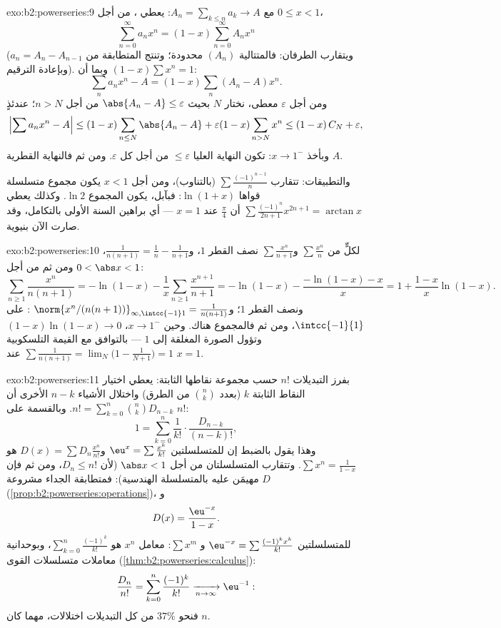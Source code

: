 \begin{solution}{exo:b2:powerseries:9}
مع $A_n = \sum_{k \leq n} a_k \to A$: يعطي ، من أجل
$0 \leq x < 1$،
\[
\sum_{n=0}^{\infty} a_n x^n = (1 - x)\sum_{n=0}^{\infty} A_n x^n
\]
(ويتقارب الطرفان: فالمتتالية $(A_n)$ محدودة؛ وتنتج المتطابقة
من $a_n = A_n - A_{n-1}$ وبإعادة الترقيم). وبما أن $(1 -
x)\sum x^n = 1$:
\[
\sum_n a_nx^n - A = (1-x)\sum_{n} (A_n - A)x^n .
\]
ومن أجل $\varepsilon$ معطى، نختار $N$ بحيث $\abs{A_n - A} \leq
\varepsilon$ من أجل $n > N$؛ عندئذٍ
\[
\Bigl|\sum a_nx^n - A\Bigr|
\leq (1-x)\sum_{n \leq N}\abs{A_n - A} + \varepsilon(1 -
x)\sum_{n > N}x^n
\leq (1-x)\,C_N + \varepsilon ,
\]
وبأخذ $x \to 1^-$: تكون النهاية العليا $\leq \varepsilon$ من أجل كل
$\varepsilon$. ومن ثم فالنهاية القطرية $A$.

والتطبيقات: تتقارب $\sum \frac{(-1)^{n-1}}{n}$ (بالتناوب)،
ومن أجل $x < 1$ يكون مجموع متسلسلة قواها $\ln(1 + x)$: فبآبل،
يكون المجموع $\ln 2$. وكذلك يعطي $\sum\frac{(-1)^n}{2n+1}x^{2n+1} =
\arctan x$ أن $\frac\pi4$ عند $x = 1$ --- أي براهين
السنة الأولى بالتكامل، وقد صارت الآن بنيوية.
\end{solution}

\begin{solution}{exo:b2:powerseries:10}
لكلٍّ من $\sum\frac{x^n}{n}$ و$\sum\frac{x^n}{n+1}$ نصف القطر
$1$، و$\frac{1}{n(n+1)} = \frac1n - \frac1{n+1}$، ومن ثم من أجل $0
< \abs x < 1$:
\[
\sum_{n\geq1}\frac{x^n}{n(n+1)}
= -\ln(1-x) - \frac1x\sum_{n\geq1}\frac{x^{n+1}}{n+1}
= -\ln(1-x) - \frac{-\ln(1-x) - x}{x}
= 1 + \frac{1-x}{x}\ln(1-x) .
\]
ونصف القطر $1$؛ و$\norm{x^n/(n(n+1))}_{\infty,\intcc{-1}1} =
\frac{1}{n(n+1)}$ :  على
$\intcc{-1}{1}$، ومن ثم فالمجموع  هناك. وحين $x \to
1^-$، $(1-x)\ln(1-x) \to 0$ وتؤول الصورة المغلقة إلى $1$ ---
بالتوافق مع القيمة التلسكوبية $\sum\frac{1}{n(n+1)} =
\lim_N\bigl(1 - \frac{1}{N+1}\bigr) = 1$ عند $x = 1$.
\end{solution}

\begin{solution}{exo:b2:powerseries:11}
بفرز التبديلات $n!$ حسب مجموعة نقاطها الثابتة: يعطي اختيار
النقاط الثابتة $k$ (بعدد $\binom nk$ من الطرق) واختلال الأشياء
$n - k$ الأخرى أن $n! = \sum_{k=0}^n\binom nk D_{n-k}$.
وبالقسمة على $n!$:
\[
1 = \sum_{k=0}^{n}\frac{1}{k!}\cdot\frac{D_{n-k}}{(n-k)!} ,
\]
وهذا يقول بالضبط إن  للمتسلسلتين $\eu^x =
\sum\frac{x^k}{k!}$ و$D(x) = \sum D_n\frac{x^n}{n!}$ هو
$\sum x^n = \frac{1}{1-x}$. وتتقارب المتسلسلتان 
من أجل $\abs x < 1$ (لأن $D_n \leq n!$، ومن ثم فإن $D$ مهيمَن عليه
بالمتسلسلة الهندسية): فمتطابقة الجداء مشروعة
(\cref{prop:b2:powerseries:operations})، و
\[
D(x) = \frac{\eu^{-x}}{1-x} .
\]
 للمتسلسلتين $\eu^{-x} = \sum\frac{(-1)^kx^k}{k!}$ و
$\sum x^m$: معامل $x^n$ هو
$\sum_{k=0}^{n}\frac{(-1)^k}{k!}$، وبوحدانية معاملات متسلسلات
القوى (\cref{thm:b2:powerseries:calculus}):
\[
\frac{D_n}{n!} = \sum_{k=0}^{n}\frac{(-1)^k}{k!}
\xrightarrow[n\to\infty]{} \eu^{-1} :
\]
فنحو $37\%$ من كل التبديلات اختلالات، مهما كان
$n$.
\end{solution}

